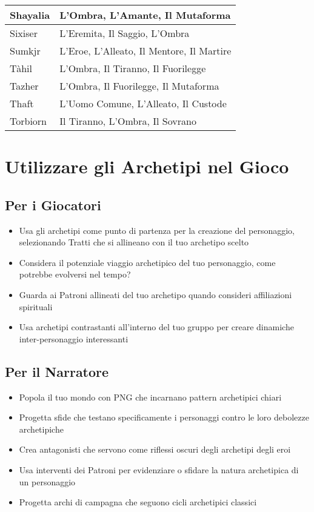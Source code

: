 \begin{multicols}{2}
\begin{tabularx}{\columnwidth}{lX}
\hline
Shayalia & L'Ombra, L'Amante, Il Mutaforma \\
\hline
Sixiser & L'Eremita, Il Saggio, L'Ombra \\
\hline
Sumkjr & L'Eroe, L'Alleato, Il Mentore, Il Martire \\
\hline
Tàhil & L'Ombra, Il Tiranno, Il Fuorilegge \\
\hline
Tazher & L'Ombra, Il Fuorilegge, Il Mutaforma \\
\hline
Thaft & L'Uomo Comune, L'Alleato, Il Custode \\
\hline
Torbiorn & Il Tiranno, L'Ombra, Il Sovrano \\
\bottomrule
\end{tabularx}

\section*{Utilizzare gli Archetipi nel Gioco}

\subsection*{Per i Giocatori}
\noindent\begin{itemize}[leftmargin=*] \setlength{\itemsep}{0pt}
\item Usa gli archetipi come punto di partenza per la creazione del personaggio, selezionando Tratti che si allineano con il tuo archetipo scelto
\item Considera il potenziale viaggio archetipico del tuo personaggio, come potrebbe evolversi nel tempo?
\item Guarda ai Patroni allineati del tuo archetipo quando consideri affiliazioni spirituali
\item Usa archetipi contrastanti all'interno del tuo gruppo per creare dinamiche inter-personaggio interessanti
\end{itemize}

\subsection*{Per il Narratore}
\noindent\begin{itemize}[leftmargin=*] \setlength{\itemsep}{0pt}
\item Popola il tuo mondo con PNG che incarnano pattern archetipici chiari
\item Progetta sfide che testano specificamente i personaggi contro le loro debolezze archetipiche
\item Crea antagonisti che servono come riflessi oscuri degli archetipi degli eroi
\item Usa interventi dei Patroni per evidenziare o sfidare la natura archetipica di un personaggio
\item Progetta archi di campagna che seguono cicli archetipici classici
\end{itemize}


\end{multicols}
